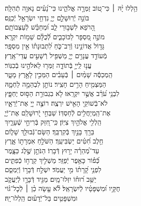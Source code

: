 \documentclass[twoside, openany, parskip=half, 11pt]{book}
\begin{document}
\begin{narrow}
הַ֥לְלוּ יָ֨הּ ׀ \hfill \break
כִּי־ט֭וֹב זַמְּרָ֣ה אֱלֹהֵ֑ינוּ \hfill כִּי־נָ֝עִ֗ים נָאוָ֥ה תְֿהִלָּֽה׃ \\
בּוֹנֵ֣ה יְֿרֽוּשָׁלַ֣‍ִם יְיָ֑ \hfill נִדְחֵ֖י יִשְׂרָאֵ֣ל יְֿכַנֵּֽס׃ \\
הָ֭רֹפֵא לִשְׁב֣וּרֵי לֵ֑ב \hfill וּ֝מְחַבֵּ֗שׁ לְֿעַצְּבוֹתָֽם׃ \\
מוֹנֶ֣ה מִ֭סְפָּר לַכּוֹכָבִ֑ים \hfill לְֿ֝כֻלָּ֗ם שֵׁמ֥וֹת יִקְרָֽא׃ \\
גָּד֣וֹל אֲדוֹנֵ֣ינוּ וְֿרַב־כֹּ֑חַ \hfill לִ֝תְבוּנָת֗וֹ אֵ֣ין מִסְפָּֽר׃ \\
מְֿעוֹדֵ֣ד עֲנָוִ֣ים יְיָ֑ \hfill מַשְׁפִּ֖יל רְֿשָׁעִ֣ים עֲדֵי־אָֽרֶץ׃ \\
עֱנ֣וּ לַֽייָ֣ בְּֿתוֹדָ֑ה \hfill זַמְּר֖וּ לֵאלֹהֵ֣ינוּ בְֿכִנּֽוֹר׃ \\
הַֽמְכַסֶּ֬ה שָׁמַ֨יִם ׀ בְּֿעָבִ֗ים \hfill הַמֵּכִ֣ין לָאָ֣רֶץ מָטָ֑ר\\ הַמַּצְמִ֖יחַ הָרִ֣ים חָצִֽיר׃ \hfill
נוֹתֵ֣ן לִבְהֵמָ֣ה לַחְמָ֑הּ\\ לִבְנֵ֥י עֹ֝רֵ֗ב אֲשֶׁ֣ר יִקְרָֽאוּ׃ \hfill
לֹ֤א בִגְבוּרַ֣ת הַסּ֣וּס יֶחְפָּ֑ץ\\ לֹא־בְֿשׁוֹקֵ֖י הָאִ֣ישׁ יִרְצֶֽה׃ \hfill
רוֹצֶ֣ה יְיָ֭ אֶת־יְֿרֵאָ֑יו\\ אֶת־הַֽמְיַחֲלִ֥ים לְֿחַסְדּֽוֹ׃ \hfill
שַׁבְּחִ֣י יְֿ֭רוּשָׁלַ‍ִם אֶת־יְֿיָ֑\\ הַֽלְלִ֖י אֱלֹהַ֣יִךְ צִיּֽוֹן׃ \hfill
כִּֽי־חִ֭זַּק בְּֿרִיחֵ֣י שְֿׁעָרָ֑יִךְ\\ בֵּרַ֖ךְ בָּנַ֣יִךְ בְּֿקִרְבֵּֽךְ׃ \hfill
הַשָּׂם־גְּֿבוּלֵ֥ךְ שָׁל֑וֹם\\ חֵ֥לֶב חִ֝טִּ֗ים יַשְׂבִּיעֵֽךְ׃ \hfill
הַשֹּׁלֵ֣חַ אִמְרָת֣וֹ אָ֑רֶץ\\ עַד־מְ֝הֵרָ֗ה יָר֥וּץ דְּֿבָרֽוֹ׃ \hfill
הַנֹּתֵ֣ן שֶׁ֣לֶג כַּצָּ֑מֶר\\ כְּֿ֝פ֗וֹר כָּאֵ֥פֶר יְֿפַזֵּֽר׃ \hfill
מַשְׁלִ֣יךְ קַֽרְח֣וֹ כְֿפִתִּ֑ים\\ לִפְנֵ֥י קָ֝רָת֗וֹ מִ֣י יַעֲמֹֽד׃ \hfill
יִשְׁלַ֣ח דְּֿבָר֣וֹ וְֿיַמְסֵ֑ם\\ יַשֵּׁ֥ב ר֝וּח֗וֹ יִזְּלוּ־מָֽיִם׃ \hfill
מַגִּ֣יד דְּֿבָרָ֣ו לְֿיַעֲקֹ֑ב\\ חֻקָּ֥יו וּ֝מִשְׁפָּטָ֗יו לְֿיִשְׂרָאֵֽל׃ \hfill
לֹ֘א עָ֤שָׂה כֵ֨ן ׀ לְֿכׇל־גּ֗וֹי\\ וּמִשְׁפָּטִ֥ים בַּל־יְֿדָע֗וּם \hfill הַֽלְלוּ־יָֽהּ׃




\end{narrow}
\end{document}
